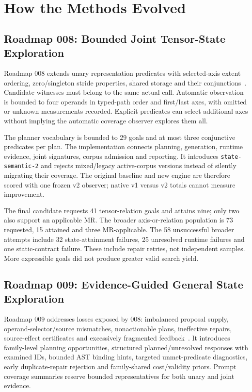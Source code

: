 \documentclass[conference]{IEEEtran}
\begin{document}
\section{How the Methods Evolved}
\subsection{Roadmap 008: Bounded Joint Tensor-State Exploration}
Roadmap 008 extends unary representation predicates with selected-axis extent ordering, zero/singleton stride properties, shared storage and their conjunctions~\cite{rm008}. Candidate witnesses must belong to the same actual call. Automatic observation is bounded to four operands in typed-path order and first/last axes, with omitted or unknown measurements recorded. Explicit predicates can select additional axes without implying the automatic coverage observer explores them all.

The planner vocabulary is bounded to 29 goals and at most three conjunctive predicates per plan. The implementation connects planning, generation, runtime evidence, joint signatures, corpus admission and reporting. It introduces \texttt{state-semantic-2} and rejects mixed/legacy active-corpus versions instead of silently migrating their coverage. The original baseline and new engine are therefore scored with one frozen v2 observer; native v1 versus v2 totals cannot measure improvement.

The final candidate requests 41 tensor-relation goals and attains nine; only two also support an applicable MR. The broader axis-or-relation population is 73 requested, 15 attained and three MR-applicable. The 58 unsuccessful broader attempts include 32 state-attainment failures, 25 unresolved runtime failures and one static-contract failure. These include repair retries, not independent samples. More expressible goals did not produce greater valid search yield.

\subsection{Roadmap 009: Evidence-Guided General State Exploration}
Roadmap 009 addresses losses exposed by 008: imbalanced proposal supply, operand-selector/source mismatches, nonactionable plans, ineffective repairs, source-effect certificates and excessively fragmented feedback~\cite{rm009}. It introduces family-level planning opportunities, structured planned/unresolved responses with examined IDs, bounded AST binding hints, targeted unmet-predicate diagnostics, early duplicate-repair rejection and family-shared cost/validity priors. Prompt coverage summaries reserve bounded representatives for both unary and joint evidence.
\end{document}
